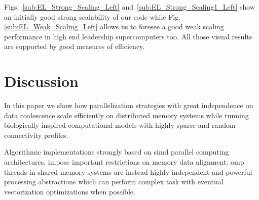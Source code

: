 \documentclass[10pt,journal,compsoc]{IEEEtran}
\begin{document}
Figs.~\ref{sub:EL_Strong_Scaling_Left} and~\ref{sub:EL_Strong_Scaling1_Left} show an initially good strong scalability of our code while Fig. \ref{sub:EL_Weak_Scaling_Left} allows us to foresee a good weak scaling performance in high end leadership supercomputers too. All those visual results are supported by good measures of efficiency.





\section{Discussion}

In this paper we show how parallelization strategies with great independence on data coalescence scale efficiently on distributed memory systems while running biologically inspired computational models with highly sparse and random connectivity profiles.

Algorithmic implementations strongly based on \gls{simd} parallel computing architectures, impose important restrictions on memory data alignment. \gls{omp} threads in shared memory systems are instead highly independent and powerful processing abstractions which can perform complex task with eventual vectorization optimizations when possible.
\end{document}
